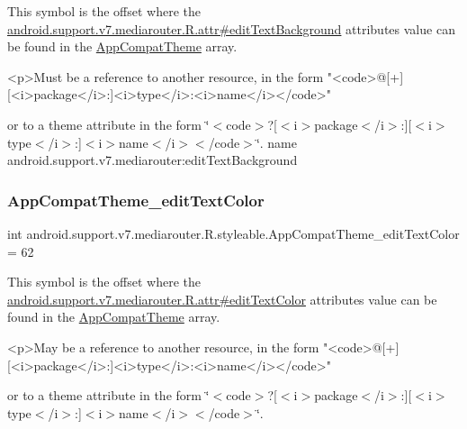 This symbol is the offset where the \hyperlink{classandroid_1_1support_1_1v7_1_1mediarouter_1_1R_1_1attr_af7eacd6e8195cfde4becb505c6a07dc5}{android.\+support.\+v7.\+mediarouter.\+R.\+attr\#edit\+Text\+Background} attribute\textquotesingle{}s value can be found in the \hyperlink{classandroid_1_1support_1_1v7_1_1mediarouter_1_1R_1_1styleable_a4e3d3900c75d49aeb2f283cac00214d6}{App\+Compat\+Theme} array.

\begin{DoxyVerb}      <p>Must be a reference to another resource, in the form "<code>@[+][<i>package</i>:]<i>type</i>:<i>name</i></code>"
\end{DoxyVerb}
 or to a theme attribute in the form \char`\"{}$<$code$>$?\mbox{[}$<$i$>$package$<$/i$>$\+:\mbox{]}\mbox{[}$<$i$>$type$<$/i$>$\+:\mbox{]}$<$i$>$name$<$/i$>$$<$/code$>$\char`\"{}.  name android.\+support.\+v7.\+mediarouter\+:edit\+Text\+Background \mbox{\label{classandroid_1_1support_1_1v7_1_1mediarouter_1_1R_1_1styleable_a24e96622e17c6e06f00fb84f96e4c62b}} 
\subsubsection{\texorpdfstring{App\+Compat\+Theme\+\_\+edit\+Text\+Color}{AppCompatTheme\_editTextColor}}
{\footnotesize\ttfamily int android.\+support.\+v7.\+mediarouter.\+R.\+styleable.\+App\+Compat\+Theme\+\_\+edit\+Text\+Color = 62\hspace{0.3cm}{\ttfamily [static]}}

This symbol is the offset where the \hyperlink{classandroid_1_1support_1_1v7_1_1mediarouter_1_1R_1_1attr_a543f76d56c48cfda37713fbce258c6f1}{android.\+support.\+v7.\+mediarouter.\+R.\+attr\#edit\+Text\+Color} attribute\textquotesingle{}s value can be found in the \hyperlink{classandroid_1_1support_1_1v7_1_1mediarouter_1_1R_1_1styleable_a4e3d3900c75d49aeb2f283cac00214d6}{App\+Compat\+Theme} array.

\begin{DoxyVerb}      <p>May be a reference to another resource, in the form "<code>@[+][<i>package</i>:]<i>type</i>:<i>name</i></code>"
\end{DoxyVerb}
 or to a theme attribute in the form \char`\"{}$<$code$>$?\mbox{[}$<$i$>$package$<$/i$>$\+:\mbox{]}\mbox{[}$<$i$>$type$<$/i$>$\+:\mbox{]}$<$i$>$name$<$/i$>$$<$/code$>$\char`\"{}. 

